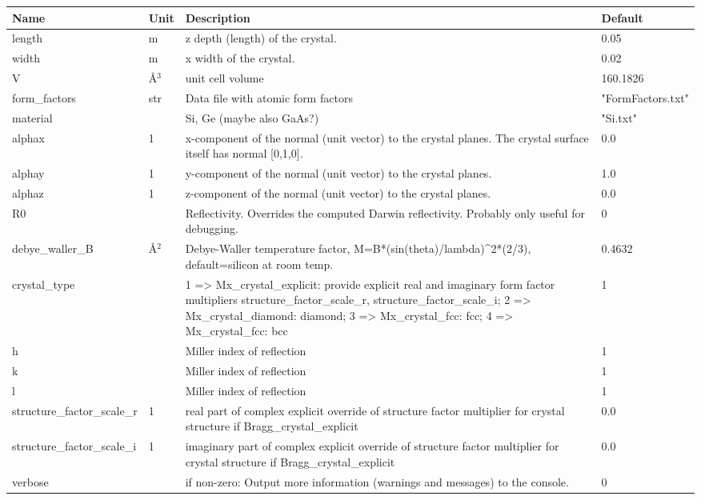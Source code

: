 \begin{longtable}{p{}p{}p{}p{}}
\toprule
\textbf{Name} & \textbf{Unit} & \textbf{Description} & \textbf{Default} \\
\midrule
\endhead
length & m & z depth (length) of the crystal. & 0.05 \\
width & m & x width of the crystal. & 0.02 \\
V & \AA{}$^{3}$ & unit cell volume & 160.1826 \\
form\_factors & str & Data file with atomic form factors & "FormFactors.txt" \\
material &   & Si, Ge (maybe also GaAs?) & "Si.txt" \\
alphax & 1 & x-component of the normal (unit vector) to the crystal planes. The crystal surface itself has normal [0,1,0]. & 0.0 \\
alphay & 1 & y-component of the normal (unit vector) to the crystal planes. & 1.0 \\
alphaz & 1 & z-component of the normal (unit vector) to the crystal planes. & 0.0 \\
R0 &   & Reflectivity. Overrides the computed Darwin reflectivity. Probably only useful for debugging. & 0 \\
debye\_waller\_B & \AA{}$^{2}$ & Debye-Waller temperature factor, M=B*(sin(theta)/lambda)\textasciicircum{}2*(2/3), default=silicon at room temp. & 0.4632 \\
crystal\_type &   & 1 =\textgreater{} Mx\_crystal\_explicit: provide explicit real and imaginary form factor multipliers structure\_factor\_scale\_r, structure\_factor\_scale\_i; 2 =\textgreater{} Mx\_crystal\_diamond: diamond; 3 =\textgreater{} Mx\_crystal\_fcc: fcc; 4 =\textgreater{} Mx\_crystal\_fcc: bcc & 1 \\
h &   & Miller index of reflection & 1 \\
k &   & Miller index of reflection & 1 \\
l &   & Miller index of reflection & 1 \\
structure\_factor\_scale\_r & 1 & real part of complex explicit override of structure factor multiplier for crystal structure if Bragg\_crystal\_explicit & 0.0 \\
structure\_factor\_scale\_i & 1 & imaginary part of complex explicit override of structure factor multiplier for crystal structure if Bragg\_crystal\_explicit & 0.0 \\
verbose &   & if non-zero: Output more information (warnings and messages) to the console. & 0 \\
\bottomrule
\end{longtable}

